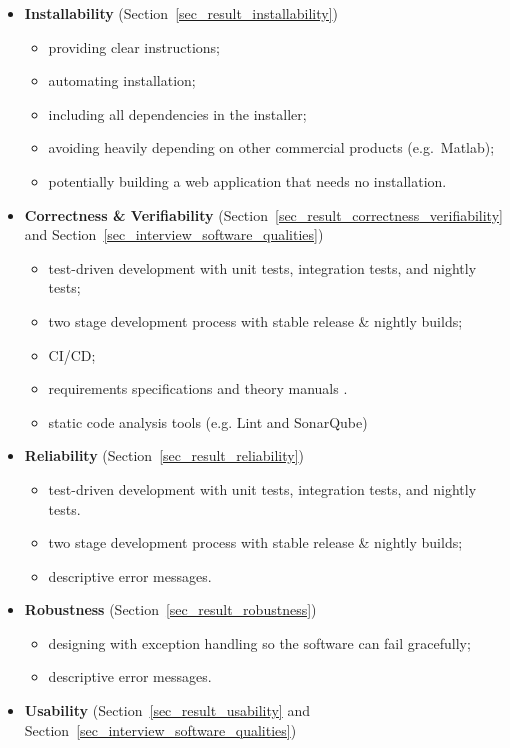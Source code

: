 \documentclass[final, 3p, times, authoryear]{elsarticle}
\begin{document}
\begin{itemize}
\item \textbf{Installability} (Section~\ref{sec_result_installability})
\begin{itemize}
    \item providing clear instructions;
    \item automating installation;
    \item including all dependencies in the installer;
    \item avoiding heavily depending on other commercial products (e.g.\ Matlab);
    \item potentially building a web application that needs no installation.
\end{itemize}
\item \textbf{Correctness \& Verifiability}
(Section~\ref{sec_result_correctness_verifiability} and
Section~\ref{sec_interview_software_qualities})
\begin{itemize}
    \item test-driven development with unit tests, integration tests, and
    nightly tests;
    \item two stage development process with stable release \& nightly builds;
    \item CI/CD;
    \item requirements specifications and theory manuals \citep{Smith2016, SmithAndLai2005}.
    \item static code analysis tools (e.g. Lint and SonarQube)
\end{itemize}
\item \textbf{Reliability} (Section~\ref{sec_result_reliability})
\begin{itemize}
    \item test-driven development with unit tests, integration tests, and nightly tests.
    \item two stage development process with stable release \& nightly builds;
    \item descriptive error messages.
\end{itemize}
\item \textbf{Robustness} (Section~\ref{sec_result_robustness})
\begin{itemize}
    \item designing with exception handling so the software can fail gracefully;
    \item descriptive error messages.
\end{itemize}
\item \textbf{Usability} (Section~\ref{sec_result_usability} and Section~\ref{sec_interview_software_qualities})

\end{itemize}
\end{document}
